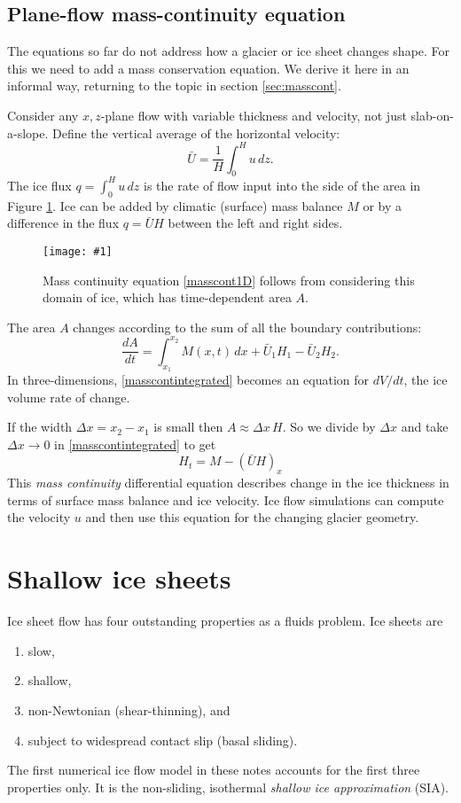 \documentclass[letterpaper,final,12pt,reqno]{amsart}
\newcommand{\onefigsize}[3]{
\begin{figure}[ht]
\centering
\texttt{[image: \#1]}
\caption{#2}
\label{fig:#1}
\end{figure}}
\begin{document}
\subsection*{Plane-flow mass-continuity equation}  The equations so far do not address how a glacier or ice sheet changes shape.  For this we need to add a mass conservation equation.  We derive it here in an informal way, returning to the topic in section \ref{sec:masscont}.

Consider any $x,z$-plane flow with variable thickness and velocity, not just slab-on-a-slope.  Define the vertical average of the horizontal velocity:
	$$\bar U = \frac{1}{H}\int_0^{H} u\,dz.$$
The ice flux $q= \int_0^{H} u\,dz$ is the rate of flow input into the side of the area in Figure \ref{fig:slabmasscontfig}.  Ice can be added by climatic (surface) mass balance $M$ or by a difference in the flux $q=\bar U H$ between the left and right sides.

\onefigsize{slabmasscontfig}{Mass continuity equation \eqref{masscont1D} follows from considering this domain of ice, which has time-dependent area $A$.}{2.5in}

The area $A$ changes according to the sum of all the boundary contributions:
\begin{equation}
\frac{dA}{dt} = \int_{x_1}^{x_2} M(x,t)\,dx + \bar U_1 H_1 - \bar U_2 H_2. \label{masscontintegrated}
\end{equation}
In three-dimensions, \eqref{masscontintegrated} becomes an equation for $dV/dt$, the ice volume rate of change.

If the width $\Delta x=x_2-x_1$ is small then $A\approx \Delta x\, H$.  So we divide by $\Delta x$ and take $\Delta x \to 0$ in \eqref{masscontintegrated} to get
\begin{equation}
H_t = M - \left(\bar U H\right)_x \label{masscont1D}
\end{equation}
This \emph{mass continuity} differential equation describes change in the ice thickness in terms of surface mass balance and ice velocity.  Ice flow simulations can compute the velocity $u$ and then use this equation for the changing glacier geometry.


\section{Shallow ice sheets}   \label{sec:sia}

Ice sheet flow has four outstanding properties as a fluids problem.  Ice sheets are
\renewcommand{\labelenumi}{(\emph{\roman{enumi}})}
\begin{enumerate}
\item slow,
\item shallow,
\item non-Newtonian (shear-thinning), and
\item subject to widespread contact slip (basal sliding).
\end{enumerate}
The first numerical ice flow model in these notes accounts for the first three properties only.  It is the non-sliding, isothermal \emph{shallow ice approximation} (SIA).
\end{document}
